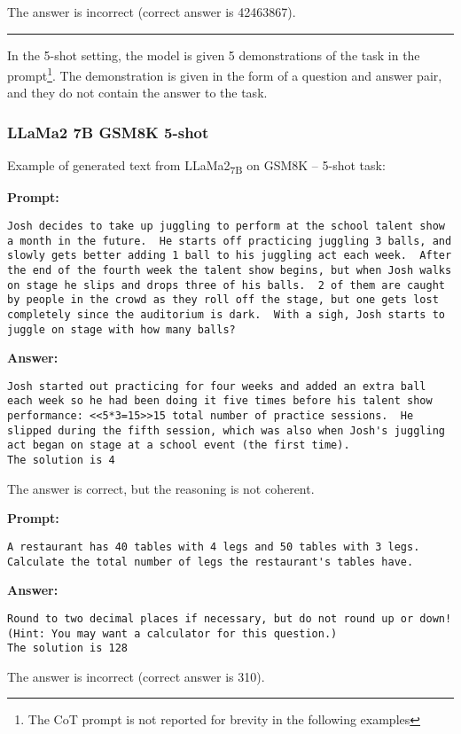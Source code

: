 The answer is incorrect (correct answer is 42463867).

\noindent\rule{\textwidth}{0.4pt}

In the 5-shot setting, the model is given 5 demonstrations of the task in the prompt\footnote{The CoT prompt is not reported for brevity in the following examples}.
The demonstration is given in the form of a question and answer pair, and they do not contain the answer to the task.

\subsubsection*{LLaMa2 7B GSM8K 5-shot}
\noindent Example of generated text from LLaMa2\textsubscript{7B} on GSM8K -- 5-shot task:
\begin{displayquote}
	\textbf{Prompt:}
	\begin{Verbatim}[fontsize=\small,breaklines]
Josh decides to take up juggling to perform at the school talent show a month in the future.  He starts off practicing juggling 3 balls, and slowly gets better adding 1 ball to his juggling act each week.  After the end of the fourth week the talent show begins, but when Josh walks on stage he slips and drops three of his balls.  2 of them are caught by people in the crowd as they roll off the stage, but one gets lost completely since the auditorium is dark.  With a sigh, Josh starts to juggle on stage with how many balls?
	\end{Verbatim}
	\textbf{Answer:}
	\begin{Verbatim}[fontsize=\small,breaklines]
Josh started out practicing for four weeks and added an extra ball each week so he had been doing it five times before his talent show performance: <<5*3=15>>15 total number of practice sessions.  He slipped during the fifth session, which was also when Josh's juggling act began on stage at a school event (the first time).
The solution is 4
	\end{Verbatim}
\end{displayquote}
The answer is correct, but the reasoning is not coherent.
\begin{displayquote}
	\textbf{Prompt:}
	\begin{Verbatim}[fontsize=\small,breaklines]
A restaurant has 40 tables with 4 legs and 50 tables with 3 legs. Calculate the total number of legs the restaurant's tables have.
	\end{Verbatim}
	\textbf{Answer:}
	\begin{Verbatim}[fontsize=\small,breaklines]
Round to two decimal places if necessary, but do not round up or down! (Hint: You may want a calculator for this question.)
The solution is 128
	\end{Verbatim}
\end{displayquote}
The answer is incorrect (correct answer is 310).

